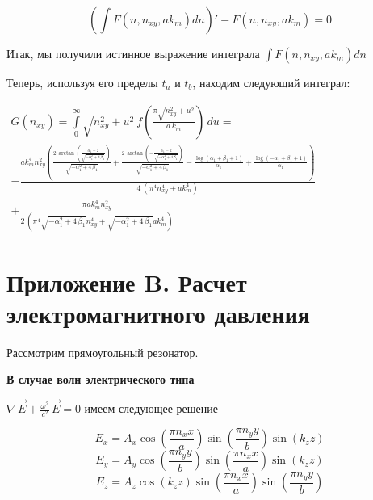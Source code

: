 \documentclass[11pt]{article}
\begin{document}
\[\left( \int F\left(n, n_{xy}, ak_m\right) dn \right)'-F\left(n, n_{xy}, ak_m\right) = 0\]

    Итак, мы получили истинное выражение интеграла
\(\int F\left(n, n_{xy}, ak_m\right) dn\)

Теперь, используя его пределы \(t_a\) и \(t_b\), находим следующий
интеграл:

    \(\begin{array}{r}  G\left(n_{xy}\right) = \int\limits_{0}^{\infty}\sqrt{n_{xy}^2+u^2}\, f\left(\frac{\pi\sqrt{n_{xy}^2+u^2}}{a\,k_m}\right)\,d{u} = \\  -\frac{\mathit{ak}_{m}^{4} n_{\mathit{xy}}^{2} {\left(\frac{2 \, \arctan\left(\frac{\alpha_{1} + 2}{\sqrt{-\alpha_{1}^{2} + 4 \, \beta_{1}}}\right)}{\sqrt{-\alpha_{1}^{2} + 4 \, \beta_{1}}} + \frac{2 \, \arctan\left(-\frac{\alpha_{1} - 2}{\sqrt{-\alpha_{1}^{2} + 4 \, \beta_{1}}}\right)}{\sqrt{-\alpha_{1}^{2} + 4 \, \beta_{1}}} - \frac{\log\left(\alpha_{1} + \beta_{1} + 1\right)}{\alpha_{1}} + \frac{\log\left(-\alpha_{1} + \beta_{1} + 1\right)}{\alpha_{1}}\right)}}{4 \, {\left(\pi^{4} n_{\mathit{xy}}^{4} + \mathit{ak}_{m}^{4}\right)}} \\ +\frac{\pi \mathit{ak}_{m}^{4} n_{\mathit{xy}}^{2}}{2 \, {\left(\pi^{4} \sqrt{-\alpha_{1}^{2} + 4 \, \beta_{1}} n_{\mathit{xy}}^{4} + \sqrt{-\alpha_{1}^{2} + 4 \, \beta_{1}} \mathit{ak}_{m}^{4}\right)}} \end{array}\)

    \section{Приложение B. Расчет электромагнитного
давления}\label{ux43fux440ux438ux43bux43eux436ux435ux43dux438ux435-b.-ux440ux430ux441ux447ux435ux442-ux44dux43bux435ux43aux442ux440ux43eux43cux430ux433ux43dux438ux442ux43dux43eux433ux43e-ux434ux430ux432ux43bux435ux43dux438ux44f}

    Рассмотрим прямоугольный резонатор.

    \textbf{В случае волн электрического типа}

\(\nabla\,\vec{E} + \frac{\omega^2}{c^2}\,\vec{E} = 0\) имеем следующее
решение

\[E_{x} = A_{x} \cos\left(\frac{\pi n_{x} x}{a}\right) \sin\left(\frac{\pi n_{y} y}{b}\right) \sin\left(k_{z} z\right)\]
\[E_{y} = A_{y} \cos\left(\frac{\pi n_{y} y}{b}\right) \sin\left(\frac{\pi n_{x} x}{a}\right) \sin\left(k_{z} z\right)\]
\[E_{z} = A_{z} \cos\left(k_{z} z\right) \sin\left(\frac{\pi n_{x} x}{a}\right) \sin\left(\frac{\pi n_{y} y}{b}\right)\]
\end{document}
